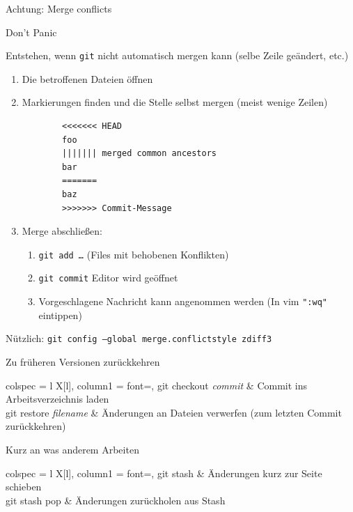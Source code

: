 \begin{frame}[fragile]{Achtung: Merge conflicts}
  \begin{center}
    \huge Don't Panic
  \end{center}

  Entstehen, wenn \texttt{git} nicht automatisch mergen kann (selbe Zeile geändert, etc.)

  \begin{enumerate}
    \item Die betroffenen Dateien öffnen
    \item Markierungen finden und die Stelle selbst mergen (meist wenige Zeilen)
      \begin{verbatim}
        <<<<<<< HEAD
        foo
        ||||||| merged common ancestors
        bar
        =======
        baz
        >>>>>>> Commit-Message
\end{verbatim}
    \item Merge abschließen:
      \begin{enumerate}
          \item \texttt{git add …} \quad (Files mit behobenen Konflikten)
        \item \texttt{git commit} \quad\rightarrow\; Editor wird geöffnet
        \item Vorgeschlagene Nachricht kann angenommen werden (In vim \texttt{":wq"} eintippen)
      \end{enumerate}
  \end{enumerate}
  Nützlich: \texttt{git config --global merge.conflictstyle zdiff3}
\end{frame}

\begin{frame}{Zu früheren Versionen zurückkehren}
  \begin{tblr}{
      colspec = {l X[l]},
      column{1} = {font=\ttfamily},
    }
    git checkout \textit{commit} & Commit ins Arbeitsverzeichnis laden \\
    git restore \textit{filename} & Änderungen an Dateien verwerfen (zum letzten Commit zurückkehren)
  \end{tblr}
\end{frame}

\begin{frame}{Kurz an was anderem Arbeiten}
  \begin{tblr}{
      colspec = {l X[l]},
      column{1} = {font=\ttfamily},
    }
    git stash     & Änderungen kurz zur Seite schieben \\
    git stash pop & Änderungen zurückholen aus Stash
  \end{tblr}
\end{frame}

